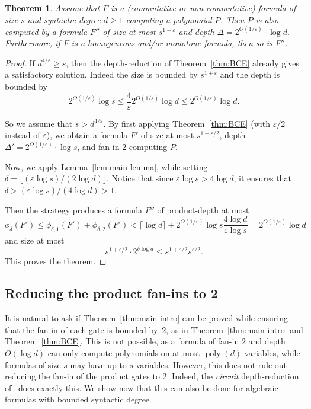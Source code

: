 \documentclass[11pt,a4paper]{article}
\newtheorem{theorem}{Theorem}
\newcommand{\poly}{\mathop{\mathrm{poly}}}
\newcommand{\comment}[2]{\marginpar{\tiny{\textbf{#1: }\textit{#2}}}}
\newcommand{\gm}[1]{\comment{GM}{#1}}
\begin{document}
\begin{theorem}
	\label{thm:strongermain}
	Assume that $F$ is a (commutative or non-commutative) formula of size $s$ and syntactic degree $d \geq 1$ computing a polynomial $P$. Then $P$ is also computed by a formula $F''$ of size at most $s^{1+\varepsilon}$ and depth $\Delta = 2^{O(1/\varepsilon)}\cdot \log d.$ Furthermore, if $F$ is a homogeneous and/or monotone formula, then so is $F''$.
\end{theorem}	

\begin{proof}
	If \(d^{4/\varepsilon} \geq s\), then the depth-reduction of Theorem~\ref{thm:BCE} already gives a satisfactory solution. Indeed the size is bounded by \(s^{1+\varepsilon}\) and the depth is bounded by
	\[
	2^{O(1/\varepsilon)} \log s \leq \frac{4}{\varepsilon} 2^{O(1/\varepsilon)}\log d \leq 2^{O(1/\varepsilon)} \log d.
	\]
	
	So we assume that \(s > d^{4/\varepsilon}\). By first applying Theorem~\ref{thm:BCE} (with $\varepsilon/2$ instead of $\varepsilon$), we obtain a formula $F'$ of size at most $s^{1+\varepsilon/2}$, depth $\Delta' = 2^{O(1/\varepsilon)}\cdot \log s$, and fan-in $2$ computing $P$.
	
	Now, we apply Lemma~\ref{lem:main-lemma}, while setting \(\delta = \lfloor {(\varepsilon \log s)}/{(2 \log d)} \rfloor\). 	 
	Notice that since \(\varepsilon \log s > 4 \log d\), it ensures that \(\delta  > (\varepsilon \log s)/(4 \log d) > 1\). 
	
	
	
	Then the strategy produces a formula $F''$ of product-depth at most
	\[
	\phi_\delta(F')\leq \phi_{\delta,1}(F') + \phi_{\delta,2}(F') <
	\lceil\log d\rceil + 2^{O(1/\varepsilon)}\log s \frac{4 \log d}{\varepsilon \log s} = 2^{O(1/\varepsilon)}\log d
	\]
	and size at most 
	\[
	s^{1+\varepsilon/2}\cdot 2^{\delta \log d} \leq s^{1+\varepsilon/2} s^{\varepsilon/2}.
	\]
	This proves the theorem.	
\end{proof}

\subsection{Reducing the product fan-ins to 2}
\label{sec:fanin2}


It is natural to ask if Theorem~\ref{thm:main-intro} can be proved while ensuring that the fan-in of each gate is bounded by~$2$, as in Theorem~\ref{thm:main-intro} and Theorem~\ref{thm:BCE}. This is not possible, as a formula of fan-in $2$ and depth $O(\log d)$ can only compute polynomials on at most $\poly(d)$ variables, while formulas of size $s$ may have up to $s$ variables. However, this does not rule out reducing the fan-in of the product gates to $2$. Indeed, the \emph{circuit} depth-reduction of~\cite{VSBR} does exactly this. We show now that this can also be done for algebraic formulas with bounded syntactic degree.
\end{document}

